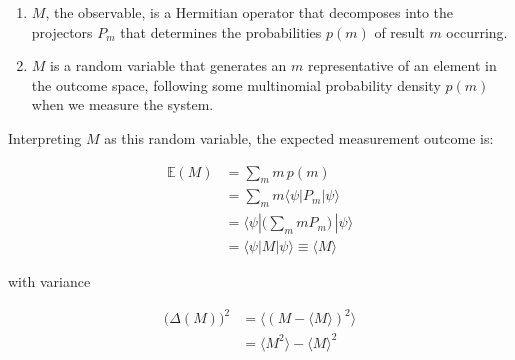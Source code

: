 \documentclass{article}
\theoremstyle{definition}
\begin{document}
    \begin{enumerate}
      \item $M$, the observable, is a Hermitian operator that decomposes into the projectors $P_m$ that determines the probabilities $p(m)$ of result $m$ occurring.
      \item $M$ is a random variable that generates an $m$ representative of an element in the outcome space, following some multinomial probability density $p(m)$ when we measure the system.
    \end{enumerate}

    Interpreting $M$ as this random variable, the expected measurement outcome is:

    \begin{align*}
      \mathbb{E}(M) & = \sum_m m\, p(m) \\
      & = \sum_m m \langle \psi | P_m | \psi \rangle \\
      & = \langle \psi | \bigg( \sum_m m P_m \bigg) \, | \psi \rangle \\
      & = \langle \psi | M | \psi \rangle \equiv \langle M \rangle
    \end{align*}

    with variance

    \begin{align*}
      \big( \Delta (M)\big)^2 & = \langle (M - \langle M \rangle )^2 \rangle \\
      & = \langle M^2 \rangle - \langle M \rangle^2
    \end{align*}
\end{document}

